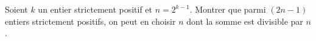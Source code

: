 Soient $k$ un entier strictement positif et $n = 2^{k-1}$. Montrer que parmi $(2n - 1)$ entiers strictement positifs, on peut en choisir $n$ dont la somme est divisible par $n$.
